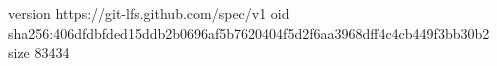 version https://git-lfs.github.com/spec/v1
oid sha256:406dfdbfded15ddb2b0696af5b7620404f5d2f6aa3968dff4c4cb449f3bb30b2
size 83434
